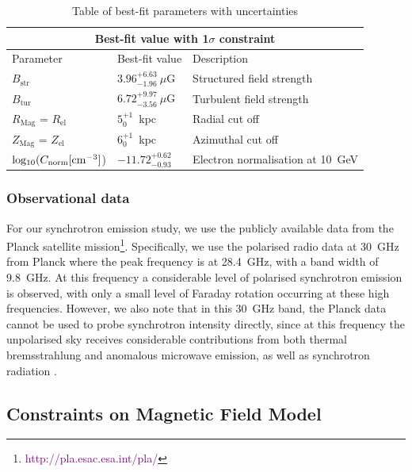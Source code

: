 \documentclass[usenatbib]{mnras}
\begin{document}
\begin{table}
\centering
\caption{Table of best-fit parameters with uncertainties}
\begin{tabular}{ |p{}|p{4.5cm}|p{6.5cm}|  }
\hline
\multicolumn{3}{|c|}{Best-fit value with 1$\sigma$ constraint} \\
\hline
\rule{0pt}{3ex}
Parameter & Best-fit value &Description \\
\hline
\hline
\rule{0pt}{3ex}
$B_{\mathrm{str}} $& $3.96_{-1.96}^{+6.63} ~ \mu$G & Structured field strength \\
\hline
\rule{0pt}{3ex}
$B_{\mathrm{tur}} $& $ 6.72_{-3.56}^{+9.97} ~\mu$G & Turbulent field strength\\
\hline
\rule{0pt}{3ex}
$R_{\mathrm{Mag}}$ = $R_{\mathrm{el}}$ & $5_{0}^{+1}$~kpc & Radial cut off \\
\hline
\rule{0pt}{3ex}
$Z_{\mathrm{Mag}}$ = $Z_{\mathrm{el}}$ & $6_{0}^{+1}$~kpc & Azimuthal cut off\\
\hline
\rule{0pt}{3ex} 
${\rm{log_{10}}}(C_{\rm norm} [{\rm cm}^{-3}]$) & ${-11.72}_{{-0.93}}^{{+0.62}}$ & Electron normalisation at 10~GeV\\
\hline
\end{tabular}
\label{Para_table}
\end{table}

\subsubsection{Observational data}
For our synchrotron emission study, we use the publicly available data from the Planck satellite mission\footnote{\textcolor{purple}{http://pla.esac.esa.int/pla/}}. Specifically, we use the polarised radio data at 30~GHz from Planck where the peak frequency is at 28.4~GHz, with a band width of 9.8~GHz. At this frequency a considerable level of polarised synchrotron emission is observed, with only a small level of Faraday rotation occurring at these high frequencies. However, we also note that in this 30~GHz band, the Planck data cannot be used to probe synchrotron intensity directly, since at this frequency the unpolarised sky receives considerable contributions from both thermal bremsstrahlung and anomalous microwave emission, as well as synchrotron radiation \citep{Planck_XIX, Planck_X, Planck_XXV, Planck_XLII}. 

\subsection{Constraints on Magnetic Field Model}
\label{Results}
\end{document}

